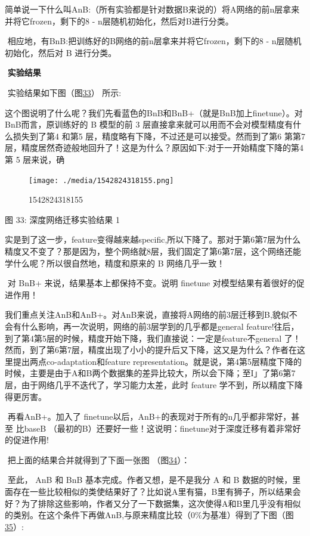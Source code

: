 ​
简单说一下什么叫AnB:（所有实验都是针对数据B来说的）将A网络的前n层拿来并将它frozen，剩下的8
- n层随机初始化，然后对B进行分类。

​ 相应地，有BnB:把训练好的B网络的前n层拿来并将它frozen，剩下的8 -
n层随机初始化，然后对 B 进行分类。

​ \textbf{实验结果}

​ 实验结果如下图（图\protect\hyperlink{bookmark145}{33}） 所示:

​ 这个图说明了什么呢？我们先看蓝色的BnB和BnB+（就是BnB加上finetune）。对
BnB而言，原训练好的 B 模型的前 3
层直接拿来就可以用而不会对模型精度有什么损失到了第4 和第5
层，精度略有下降，不过还是可以接受。然而到了第6
第第7层，精度居然奇迹般地回升了！这是为什么？原因如下:对于一开始精度下降的第4
第 5 层来说，确

\begin{figure}
\centering
\texttt{[image: ./media/1542824318155.png]}
\caption{1542824318155}
\end{figure}

图 33: 深度网络迁移实验结果 1

实是到了这一步，feature变得越来越specific,所以下降了。那对于第6第7层为什么精度又不变了？那是因为，整个网络就8层，我们固定了第6第7层，这个网络还能学什么呢？所以很自然地，精度和原来的
B 网络几乎一致！

​ 对 BnB+ 来说，结果基本上都保持不变。说明 finetune
对模型结果有着很好的促进作用！

​
我们重点关注AnB和AnB+。对AnB来说，直接将A网络的前3层迁移到B,貌似不会有什么影响，再一次说明，网络的前3层学到的几乎都是general
feature!往后，到了第4第5层的时候，精度开始下降，我们直接说：一定是feature不general
了！然而，到了第6第7层，精度出现了小小的提升后又下降，这又是为什么？作者在这里提出两点co-adaptation和feature
representation。就是说，第4第5层精度下降的时候，主要是由于A和B两个数据集的差异比较大，所以会下降；至I」了第6第7层，由于网络几乎不迭代了，学习能力太差，此时
feature 学不到，所以精度下降得更厉害。

​ 再看AnB+。加入了 finetune以后，AnB+的表现对于所有的n几乎都非常好，甚至
比baseB
（最初的B）还要好一些！这说明：finetune对于深度迁移有着非常好的促进作用!

​ 把上面的结果合并就得到了下面一张图
（图\protect\hyperlink{bookmark138}{34}）：

​ 至此， AnB 和 BnB 基本完成。作者又想，是不是我分 A 和 B
数据的时候，里面存在一些比较相似的类使结果好了？比如说A里有猫，B里有狮子，所以结果会好？为了排除这些影响，作者又分了一下数据集，这次使得A和B里几乎没有相似的类别。在这个条件下再做AnB,与原来精度比较（0\%为基准）得到了下图（图\protect\hyperlink{bookmark139}{35}）:

